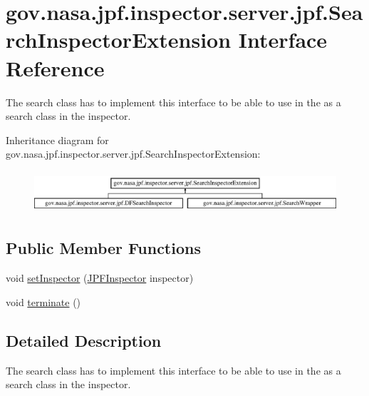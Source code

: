 \hypertarget{interfacegov_1_1nasa_1_1jpf_1_1inspector_1_1server_1_1jpf_1_1_search_inspector_extension}{}\section{gov.\+nasa.\+jpf.\+inspector.\+server.\+jpf.\+Search\+Inspector\+Extension Interface Reference}
\label{interfacegov_1_1nasa_1_1jpf_1_1inspector_1_1server_1_1jpf_1_1_search_inspector_extension}


The search class has to implement this interface to be able to use in the as a search class in the inspector.  


Inheritance diagram for gov.\+nasa.\+jpf.\+inspector.\+server.\+jpf.\+Search\+Inspector\+Extension\+:\begin{figure}[H]
\begin{center}
\leavevmode
\includegraphics[height=1.573034cm]{interfacegov_1_1nasa_1_1jpf_1_1inspector_1_1server_1_1jpf_1_1_search_inspector_extension}
\end{center}
\end{figure}
\subsection*{Public Member Functions}
\begin{DoxyCompactItemize}
\item 
void \hyperlink{interfacegov_1_1nasa_1_1jpf_1_1inspector_1_1server_1_1jpf_1_1_search_inspector_extension_ac3766f057f695b446441f048415d07a6}{set\+Inspector} (\hyperlink{classgov_1_1nasa_1_1jpf_1_1inspector_1_1server_1_1jpf_1_1_j_p_f_inspector}{J\+P\+F\+Inspector} inspector)
\item 
void \hyperlink{interfacegov_1_1nasa_1_1jpf_1_1inspector_1_1server_1_1jpf_1_1_search_inspector_extension_a681234426cc73a32683716de6aa68490}{terminate} ()
\end{DoxyCompactItemize}


\subsection{Detailed Description}
The search class has to implement this interface to be able to use in the as a search class in the inspector. 

